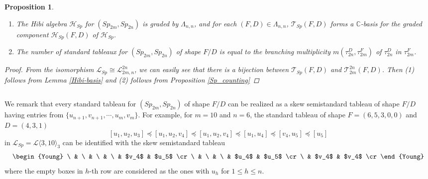 \documentclass[11pt]{amsart}
\numberwithin{equation}{subsection}
\newtheorem{proposition}[theorem]{Proposition}
\begin{document}
\begin{proposition}\label{Sp_Hibi} 
\begin{enumerate}
\item The Hibi algebra $\mathcal{H}_{Sp}$ for $(Sp_{2m}, Sp_{2n})$
is graded by $\Lambda _{n,n}$,  and for each $(F,D) \in \Lambda _{n,n}$, 
$\mathcal{T}_{Sp}(F,D)$ forms a $\mathbb{C}$-basis for the graded component 
$\mathcal{H}_{Sp}(F,D)$ of $\mathcal{H}_{Sp}$.

\item The number of standard tableaux for $(Sp_{2m}, Sp_{2n})$ of shape $F/D$
is equal to the branching multiplicity $m(\tau^D_{2n}, \tau^F_{2m})$
of $\tau^D_{2n}$ in  $\tau^F_{2m}$.
\end{enumerate}
\begin{proof}
From the isomorphism $\mathcal{L}_{Sp} \cong \mathcal{L}^{2n}_{2m,n}$, 
we can easily see that there is a bijection 
between $\mathcal{T}_{Sp}(F,D)$ and $\mathcal{T}^{2n}_{2m} (F,D)$.
Then (1) follows from Lemma \ref{Hibi-basis} and
(2) follows from Proposition \ref{Sp_counting}
\end{proof}
\end{proposition}


\subsection{}\label{order increasing SP}


We remark that every standard tableau for $(Sp_{2m}, Sp_{2n})$ of shape $F/D$
can be realized as a skew semistandard tableau of shape $F/D$ having
entries from $\{u_{n+1}, v_{n+1}, \cdots , u_m, v_m \}$.
For example, for $m=10$ and $n=6$, the standard tableau
of shape $F=(6,5,3,0,0)$ and $D=(4,3,1)$ 
$$[u_1,u_2, u_3] \preceq [u_1,u_2,v_4] \preceq [u_1,u_2,v_4] 
\preceq [u_1,u_4] \preceq [v_4,u_5] \preceq [u_5]$$
in $\mathcal{L}_{Sp} = \mathcal{L}\langle 3, 10 \rangle_3$ can be
identified with the skew semistandard tableau
\begin{equation*}
\begin{Young}
 \  & \   & \    & \     & $v_4$ & $u_5$ \cr
 \  & \   & \   & $u_4$ & $u_5$ \cr
 \  & $v_4$ & $v_4$  \cr
\end{Young}
\end{equation*}
where the empty boxes in $h$-th row are considered as the ones with $u_h$ 
for $1 \leq h \leq n$.

\smallskip
\end{document}
